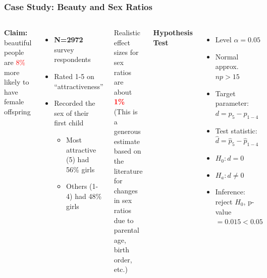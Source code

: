 \documentclass[slidestop,compress,mathserif]{beamer}
\begin{document}
\begin{frame}

	\frametitle{Case Study: Beauty and Sex Ratios}

	\begin{columns}
			\textbf{Claim:} beautiful people are \textcolor{red}{8\%} more likely to have female offspring
			\begin{itemize}
				\item \textbf{N=2972} survey respondents
				\item Rated 1-5 on ``attractiveness''
				\item Recorded the sex of their first child
				\begin{itemize}
					\item Most attractive (5) had 56\% girls
					\item Others (1-4) had 48\% girls
				\end{itemize}
			\end{itemize}
		\vspace{0.2em}
		\begin{block}{}
			\footnotesize
				\textcolor{green!60!black}{Realistic effect sizes for sex ratios are about \textcolor{red}{\textbf{1\%}} (This is a generous estimate based on the literature for changes in sex ratios due to parental age, birth order, etc.)}
		\end{block}
		\vspace{0.5em}
			\textbf{Hypothesis Test}
			\begin{itemize}
				\item Level $\alpha = 0.05$
				\item Normal approx. $np > 15$
				\item Target parameter: $d = p_5 - p_{1-4}$
				\item Test statistic: $\hat{d} = \hat{p}_5 - \hat{p}_{1-4}$
				\item $H_0: d = 0$
				\item $H_a: d \neq 0$
				\item Inference: reject $H_0$, p-value$=0.015<0.05$
			\end{itemize}
	\end{columns}

\end{frame}

\end{document}
